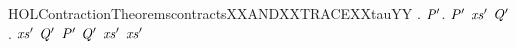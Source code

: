\newcommand{\HOLContractionTheoremscontractsXXANDXXTRACEXXtau}{\UseVerbatim{HOLContractionTheoremscontractsXXANDXXTRACEXXtau}}
\begin{SaveVerbatim}{HOLContractionTheoremscontractsXXANDXXTRACEXXtauYY}
\HOLTokenTurnstile{} \HOLSymConst{\HOLTokenForall{}} .
        \HOLSymConst{\HOLTokenImp{}}
     \HOLSymConst{\HOLTokenForall{}} \ensuremath{\HOLBoundVar{P}\sp{\prime{}}}.
          \ensuremath{\HOLBoundVar{P}\sp{\prime{}}} \HOLSymConst{\HOLTokenConj{}}   \HOLSymConst{\HOLTokenImp{}}
       \HOLSymConst{\HOLTokenExists{}}\ensuremath{\HOLBoundVar{xs}\sp{\prime{}}} \ensuremath{\HOLBoundVar{Q}\sp{\prime{}}}.
           \ensuremath{\HOLBoundVar{xs}\sp{\prime{}}} \ensuremath{\HOLBoundVar{Q}\sp{\prime{}}} \HOLSymConst{\HOLTokenConj{}} \ensuremath{\HOLBoundVar{P}\sp{\prime{}}}  \ensuremath{\HOLBoundVar{Q}\sp{\prime{}}} \HOLSymConst{\HOLTokenConj{}}
          \ensuremath{\HOLBoundVar{xs}\sp{\prime{}}} \HOLSymConst{\HOLTokenLeq{}}   \HOLSymConst{\HOLTokenConj{}}  \ensuremath{\HOLBoundVar{xs}\sp{\prime{}}}
\end{SaveVerbatim}
\newcommand{\HOLContractionTheoremscontractsXXANDXXTRACEXXtauYY}{\UseVerbatim{HOLContractionTheoremscontractsXXANDXXTRACEXXtauYY}}
